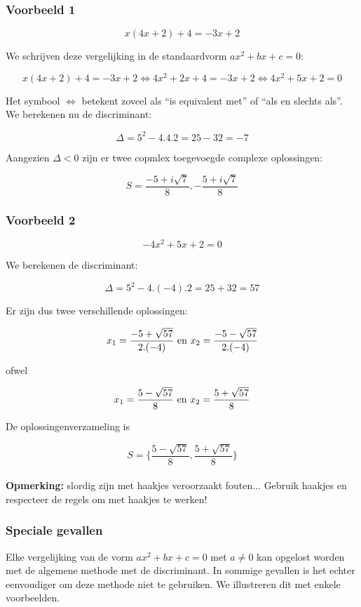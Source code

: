 \subsubsection{Voorbeeld 1}

\[ x(4x+2)+4 = -3x+2 \]

We schrijven deze vergelijking in de standaardvorm $ax^2 +bx + c =0$:

\[ x(4x+2)+4 = -3x+2 \Leftrightarrow 4x^2 + 2x +4 = -3x +2 \Leftrightarrow 4x^2 + 5x +2 = 0 \]

Het symbool $\Leftrightarrow$ betekent zoveel als ``is equivalent met'' of ``als en slechts als''.\\
We berekenen nu de discriminant:

\[ \Delta = 5^2 - 4.4.2= 25-32= -7 \]

Aangezien $\Delta < 0$ zijn er twee copmlex toegevoegde complexe oplossingen:

\[ S= \frac{-5+i\sqrt{7}}{8}, -\frac{5+i\sqrt{7}}{8} \]

\subsubsection{Voorbeeld 2}

\[ -4x^2 +5x +2=0 \]

We berekenen de discriminant:

\[ \Delta = 5^2 - 4.(-4).2 = 25 + 32 =57 \]

Er zijn dus twee verschillende oplossingen:

\[ x_{1}=\frac{-5 + \sqrt{57}}{2.(-4)} \textup{  en  } x_{2}=\frac{-5 - \sqrt{57}}{2.(-4)} \]

ofwel

\[ x_{1}=\frac{5 - \sqrt{57}}{8} \textup{  en  } x_{2}=\frac{5 + \sqrt{57}}{8} \]

De oplossingenverzameling is

\[ S=\{ \frac{5 - \sqrt{57}}{8}, \frac{5 + \sqrt{57}}{8} \} \] \\

{\bf Opmerking:} slordig zijn met haakjes veroorzaakt fouten... Gebruik haakjes en respecteer de regels om met haakjes te werken!\\

\subsubsection{Speciale gevallen}

Elke vergelijking van de vorm $ax^2 +bx +c =0$ met $a \neq 0$ kan opgelost worden met de algemene methode met de discriminant. In sommige gevallen is het echter eenvoudiger om deze methode niet te gebruiken. We illustreren dit met enkele voorbeelden.

